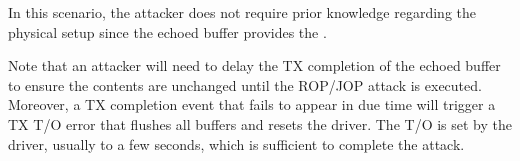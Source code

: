 
In this scenario, the attacker does not require prior knowledge regarding the physical setup since the echoed buffer provides the \kva.  

Note that an attacker will need to delay the TX completion of the echoed buffer to ensure the contents are unchanged until the ROP/JOP attack is executed.
Moreover, a TX completion event that fails to appear in due time will trigger a TX T/O error that flushes all buffers and resets the driver. The T/O is set by the driver, usually to a few seconds, which is sufficient to complete the attack.
 







